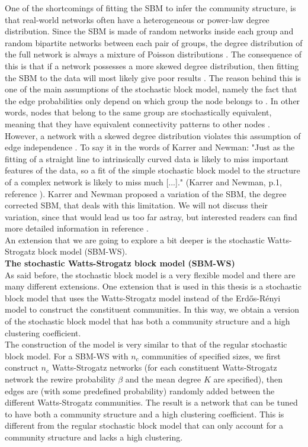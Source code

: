 \documentclass[11 pt , letterpaper , twoside , openright]{book}
\begin{document}
One of the shortcomings of fitting the SBM to infer the community structure, is that real-world networks often have a heterogeneous or power-law degree distribution. Since the SBM is made of random networks inside each group and random bipartite networks between each pair of groups, the degree distribution of the full network is always a mixture of Poisson distributions \cite{Clauset2017}. The consequence of this is that if a network possesses a more skewed degree distribution, then fitting the SBM to the data will most likely give poor results \cite{Karrer2011}. The reason behind this is one of the main assumptions of the stochastic block model, namely the fact that the edge probabilities only depend  on which group the node belongs to \cite{Clauset2017}. In other words, nodes that belong to the same group are stochastically  equivalent, meaning that they have equivalent connectivity patterns to other nodes \cite{Clauset2017}. However, a network with a skewed degree distribution violates this assumption of edge independence \cite{Clauset2017}. To say it in the words of Karrer and Newman: "Just as the fitting of a straight line to intrinsically curved data is likely to miss important features of the data, so a fit of the simple stochastic block model to the structure of a complex network is likely to miss much [...]." (Karrer and Newman, p.1, reference \cite{Karrer2011}). Karrer and Newman proposed a variation of the SBM, the degree corrected SBM, that deals with this limitation. We will not discuss their variation, since that would lead us too far astray, but interested readers can find more detailed information in reference \cite{Karrer2011}. \\
\newline
An extension that we are going to explore a bit deeper is the stochastic Watts-Strogatz block model (SBM-WS).\\
\newpage
\noindent
\textbf{The stochastic Watts-Strogatz block model (SBM-WS)}\\
\newline
As said before, the stochastic block model is a very flexible model and there are many different extensions. One extension that is used in this thesis is a stochastic block model that uses the Watts-Strogatz model instead of the Erd\H{o}s-R\'{e}nyi model to construct the constituent communities. In this way, we obtain a version of the stochastic block model that has both a community structure and a high clustering coefficient.\\
\newline
The construction of the model is very similar to that of the regular stochastic block model. For a SBM-WS with $n_c$ communities of specified sizes, we first construct $n_c$ Watts-Strogatz networks (for each constituent Watts-Strogatz network the rewire probability $\beta$ and the mean degree $K$ are specified), then edges are (with some predefined probability) randomly added between the different Watts-Strogatz communities. The result is a network that can be tuned to have both a community structure and a high clustering coefficient. This is different from the regular stochastic block model that can only account for a community structure and lacks a high clustering.
\end{document}
